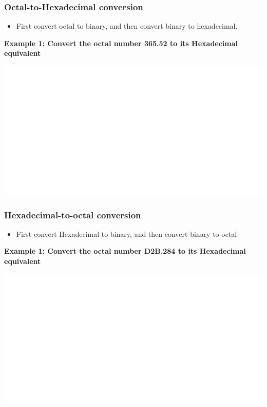 \documentclass[]{book}
\providecommand{\tightlist}{%
  \setlength{\itemsep}{0pt}\setlength{\parskip}{0pt}}
\begin{document}
\hypertarget{octal-to-hexadecimal-conversion}{%
\subsubsection{Octal-to-Hexadecimal conversion}\label{octal-to-hexadecimal-conversion}}

\begin{itemize}
\tightlist
\item
  First convert octal to binary, and then convert binary to hexadecimal.
\end{itemize}

\textbf{Example 1: Convert the octal number 365.52 to its Hexadecimal equivalent}

\begin{center}\includegraphics[width=1\linewidth]{figure/NSbox20-1} \end{center}

\hypertarget{hexadecimal-to-octal-conversion}{%
\subsubsection{Hexadecimal-to-octal conversion}\label{hexadecimal-to-octal-conversion}}

\begin{itemize}
\tightlist
\item
  First convert Hexadecimal to binary, and then convert binary to octal
\end{itemize}

\textbf{Example 1: Convert the octal number D2B.284 to its Hexadecimal equivalent}

\begin{center}\includegraphics[width=1\linewidth]{figure/NSbox21-1} \end{center}
\end{document}
